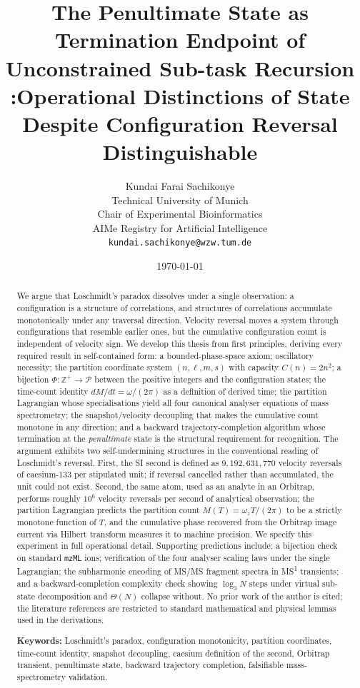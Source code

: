 \documentclass[twocolumn,10pt,a4paper]{article}
\title{\textbf{The Penultimate State as Termination Endpoint of Unconstrained Sub-task Recursion :Operational Distinctions of State Despite Configuration Reversal Distinguishable }}
\author{
Kundai Farai Sachikonye\\
Technical University of Munich\\
Chair of Experimental Bioinformatics\\
AIMe Registry for Artificial Intelligence\\
\texttt{kundai.sachikonye@wzw.tum.de}
}
\date{\today}
\theoremstyle{thmstyle}
\theoremstyle{definition}
\theoremstyle{remark}
\newcommand{\Zp}{\mathbb{Z}^{+}}
\newcommand{\Parts}{\mathcal{P}}
\newcommand{\PhiMap}{\varPhi}
\begin{document}
\maketitle

\begin{abstract}
\noindent
We argue that Loschmidt's paradox dissolves under a single observation:
a configuration is a structure of correlations, and structures of
correlations accumulate monotonically under any traversal direction.
Velocity reversal moves a system through configurations that resemble
earlier ones, but the cumulative configuration count is independent of
velocity sign. We develop this thesis from first principles, deriving
every required result in self-contained form: a bounded-phase-space
axiom; oscillatory necessity; the partition coordinate system
$(n,\ell,m,s)$ with capacity $C(n)=2n^{2}$; a bijection
$\PhiMap:\Zp\to\Parts$ between the positive integers and the
configuration states; the time-count identity $dM/dt=\omega/(2\pi)$ as
a definition of derived time; the partition Lagrangian whose
specialisations yield all four canonical analyser equations of mass
spectrometry; the snapshot/velocity decoupling that makes the
cumulative count monotone in any direction; and a backward
trajectory-completion algorithm whose termination at the
\emph{penultimate} state is the structural requirement for
recognition. The argument exhibits two self-undermining structures
in the conventional reading of Loschmidt's reversal. First, the SI
second is defined as $9{,}192{,}631{,}770$ velocity reversals of
caesium-133 per stipulated unit; if reversal cancelled rather than
accumulated, the unit could not exist. Second, the same atom, used as
an analyte in an Orbitrap, performs roughly $10^{6}$ velocity reversals
per second of analytical observation; the partition Lagrangian
predicts the partition count $M(T)=\omega_{z}T/(2\pi)$ to be a strictly
monotone function of $T$, and the cumulative phase recovered from the
Orbitrap image current via Hilbert transform measures it to machine
precision. We specify this experiment in full operational detail.
Supporting predictions include: a bijection check on standard
\texttt{mzML} ions; verification of the four analyser scaling laws
under the single Lagrangian; the subharmonic encoding of MS/MS fragment
spectra in MS\textsuperscript{1} transients; and a backward-completion
complexity check showing $\log_{3}N$ steps under virtual sub-state
decomposition and $\Theta(N)$ collapse without. No prior work of the
author is cited; the literature references are restricted to standard
mathematical and physical lemmas used in the derivations.

\medskip
\noindent\textbf{Keywords:} Loschmidt's paradox, configuration
monotonicity, partition coordinates, time-count identity, snapshot
decoupling, caesium definition of the second, Orbitrap transient,
penultimate state, backward trajectory completion, falsifiable
mass-spectrometry validation.
\end{abstract}
\end{document}
